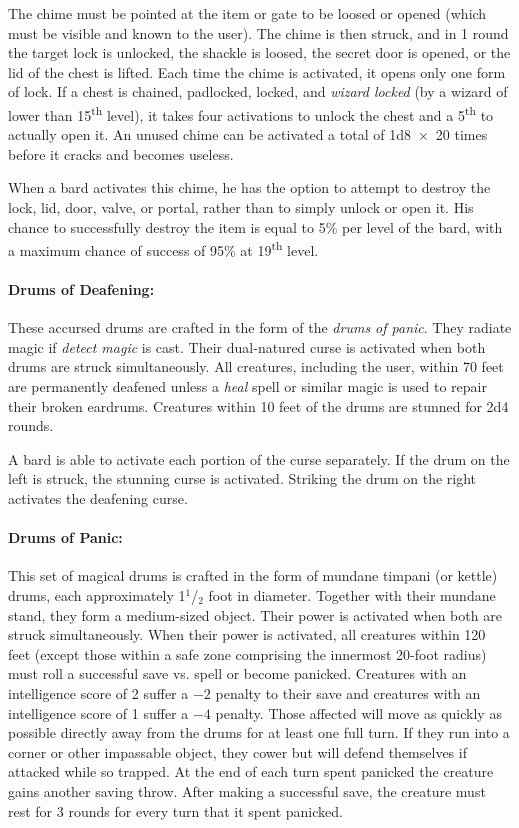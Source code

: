 \begin{multicols}{2}
The chime must be pointed at the item or gate to be loosed or opened (which must be visible and known to the user).  The chime is then struck, and in 1 round the target lock is unlocked, the shackle is loosed, the secret door is opened, or the lid of the chest is lifted.  Each time the chime is activated, it opens only one form of lock.  If a chest is chained, padlocked, locked, and \textit{wizard locked} (by a wizard of lower than 15\textsuperscript{th} level), it takes four activations to unlock the chest and a 5\textsuperscript{th} to actually open it.  An unused chime can be activated a total of 1d8~$\times$~20 times before it cracks and becomes useless.

When a bard activates this chime, he has the option to attempt to destroy the lock, lid, door, valve, or portal, rather than to simply unlock or open it.  His chance to successfully destroy the item is equal to 5\% per level of the bard, with a maximum chance of success of 95\% at 19\textsuperscript{th} level.

\paragraph{Drums of Deafening:} These accursed drums are crafted in the form of the \textit{drums of panic}.  They radiate magic if \textit{detect magic} is cast.  Their dual-natured curse is activated when both drums are struck simultaneously.  All creatures, including the user, within 70 feet are permanently deafened unless a \textit{heal} spell or similar magic is used to repair their broken eardrums.  Creatures within 10 feet of the drums are stunned for 2d4 rounds.

A bard is able to activate each portion of the curse separately.  If the drum on the left is struck, the stunning curse is activated.  Striking the drum on the right activates the deafening curse.

\paragraph{Drums of Panic:} This set of magical drums is crafted in the form of mundane timpani (or kettle) drums, each approximately 1$^1$/$_2$ foot in diameter.  Together with their mundane stand, they form a medium-sized object.  Their power is activated when both are struck simultaneously.  When their power is activated, all creatures within 120 feet (except those within a safe zone comprising the innermost 20-foot radius) must roll a successful save vs. spell or become panicked.  Creatures with an intelligence score of 2 suffer a $-2$ penalty to their save and creatures with an intelligence score of 1 suffer a $-4$ penalty.  Those affected will move as quickly as possible directly away from the drums for at least one full turn.  If they run into a corner or other impassable object, they cower but will defend themselves if attacked while so trapped.  At the end of each turn spent panicked the creature gains another saving throw.  After making a successful save, the creature must rest for 3 rounds for every turn that it spent panicked.


\end{multicols}
